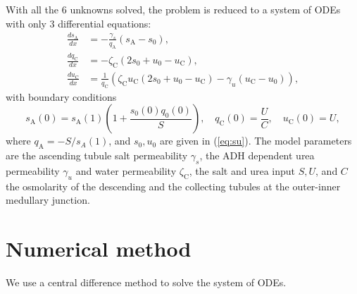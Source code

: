 \documentclass{article}
\numberwithin{equation}{section} %
\begin{document}
With all the 6 unknowns solved, the problem is reduced to a system of ODEs with only 3 differential equations:
\begin{align}
    \frac{ds_\mathrm{A}}{dx} &= -\frac{\gamma_s}{q_\mathrm{A}}(s_\mathrm{A} - s_0),\\
    \frac{dq_\mathrm{C}}{dx} &= -\zeta_\mathrm{C}(2s_0+u_0-u_\mathrm{C}),\\
    \frac{du_\mathrm{C}}{dx} &= \frac{1}{q_\mathrm{C}}\left(\zeta_\mathrm{C}u_\mathrm{C}(2 s_0+u_0 - u_\mathrm{C})- \gamma_u(u_\mathrm{C} - u_0)\right),
\end{align}
    with boundary conditions
\begin{equation}
    s_\mathrm{A}(0) = s_\mathrm{A}(1)\left( 1+\frac{s_0(0)q_0(0)}{S} \right),\quad q_\mathrm{C}(0) = \frac{U}{C},\quad u_\mathrm{C}(0) = U,
\end{equation}
    where $q_\mathrm{A} = -S/s_A(1)$, and $s_0,u_0$ are given in (\ref{eq:su}).
The model parameters are the ascending tubule salt permeability $\gamma_s$, the ADH dependent urea permeability $\gamma_u$ and water permeability $\zeta_\mathrm{C}$, the salt and urea input $S,U$, and $C$ the osmolarity of the descending and the collecting tubules at the outer-inner medullary junction.

\section{Numerical method}
We use a central difference method to solve the system of ODEs.
\end{document}
